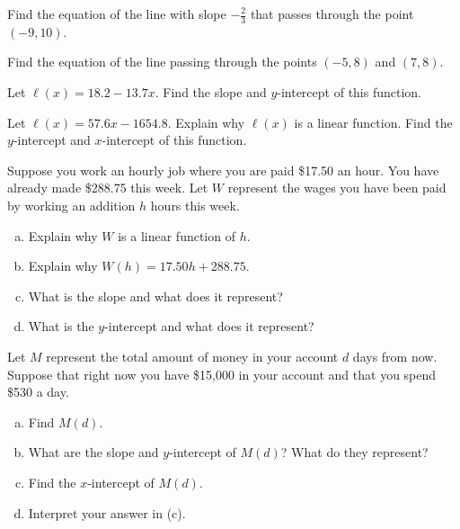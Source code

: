 \documentclass[11pt,letterpaper]{article}
\begin{document}

 Find the equation of the line with slope $-\frac{2}{3}$ that passes through the point $(-9 ,10)$. 



\newpage



 Find the equation of the line passing through the points $(-5, 8)$ and $(7, 8)$. 



\newpage



 Let $\ell(x)= 18.2 - 13.7x$. Find the slope and $y$-intercept of this function. 



\newpage



 Let $\ell(x)= 57.6x - 1654.8$. Explain why $\ell(x)$ is a linear function. Find the $y$-intercept and $x$-intercept of this function.



\newpage



 Suppose you work an hourly job where you are paid \$17.50 an hour. You have already made \$288.75 this week. Let $W$ represent the wages you have been paid by working an addition $h$ hours this week.
	\begin{enumerate}[(a)]
	\item Explain why $W$ is a linear function of $h$. 
	\item Explain why $W(h)= 17.50h + 288.75$.
	\item What is the slope and what does it represent?
	\item What is the $y$-intercept and what does it represent?
	\end{enumerate}



\newpage



 Let $M$ represent the total amount of money in your account $d$ days from now. Suppose that right now you have \$15,000 in your account and that you spend \$530 a day.
	\begin{enumerate}[(a)]
	\item Find $M(d)$.
	\item What are the slope and $y$-intercept of $M(d)$? What do they represent?
	\item Find the $x$-intercept of $M(d)$.
	\item Interpret your answer in (c). 
	\end{enumerate}
\end{document}
